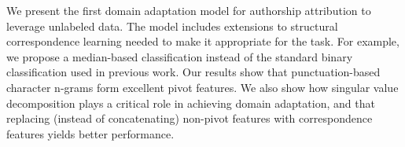 We present the first domain adaptation model for authorship attribution to leverage unlabeled data.  The model includes extensions to structural correspondence learning needed to make it appropriate for the task. For example, we propose a median-based classification instead of the standard binary classification used in previous work. Our results show that punctuation-based character n-grams form excellent pivot features. We also show how singular value decomposition plays a critical role in achieving domain adaptation, and that replacing (instead of concatenating) non-pivot features with correspondence features yields better performance.

